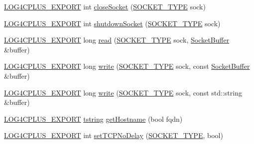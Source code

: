 \begin{DoxyCompactItemize}
\item 
\hyperlink{config_8hxx_ab13cb1a5317c245ee2ef4f2bfe0cfb2d}{L\-O\-G4\-C\-P\-L\-U\-S\-\_\-\-E\-X\-P\-O\-R\-T} int \hyperlink{namespacelog4cplus_1_1helpers_a3b3948988abc22a173de7815370a4527}{close\-Socket} (\hyperlink{namespacelog4cplus_1_1helpers_afe2a1567866b6a9e0bfd5d425c3323f2}{S\-O\-C\-K\-E\-T\-\_\-\-T\-Y\-P\-E} sock)
\item 
\hyperlink{config_8hxx_ab13cb1a5317c245ee2ef4f2bfe0cfb2d}{L\-O\-G4\-C\-P\-L\-U\-S\-\_\-\-E\-X\-P\-O\-R\-T} int \hyperlink{namespacelog4cplus_1_1helpers_af5c4aabb0dd714fbec7cc7bc31222f5b}{shutdown\-Socket} (\hyperlink{namespacelog4cplus_1_1helpers_afe2a1567866b6a9e0bfd5d425c3323f2}{S\-O\-C\-K\-E\-T\-\_\-\-T\-Y\-P\-E} sock)
\item 
\hyperlink{config_8hxx_ab13cb1a5317c245ee2ef4f2bfe0cfb2d}{L\-O\-G4\-C\-P\-L\-U\-S\-\_\-\-E\-X\-P\-O\-R\-T} long \hyperlink{namespacelog4cplus_1_1helpers_a34dfe75b9deb21d9c48a5c5a68baec87}{read} (\hyperlink{namespacelog4cplus_1_1helpers_afe2a1567866b6a9e0bfd5d425c3323f2}{S\-O\-C\-K\-E\-T\-\_\-\-T\-Y\-P\-E} sock, \hyperlink{classlog4cplus_1_1helpers_1_1SocketBuffer}{Socket\-Buffer} \&buffer)
\item 
\hyperlink{config_8hxx_ab13cb1a5317c245ee2ef4f2bfe0cfb2d}{L\-O\-G4\-C\-P\-L\-U\-S\-\_\-\-E\-X\-P\-O\-R\-T} long \hyperlink{namespacelog4cplus_1_1helpers_adf5c3e3ef3b2737e0dcf4dcb9cca2a41}{write} (\hyperlink{namespacelog4cplus_1_1helpers_afe2a1567866b6a9e0bfd5d425c3323f2}{S\-O\-C\-K\-E\-T\-\_\-\-T\-Y\-P\-E} sock, const \hyperlink{classlog4cplus_1_1helpers_1_1SocketBuffer}{Socket\-Buffer} \&buffer)
\item 
\hyperlink{config_8hxx_ab13cb1a5317c245ee2ef4f2bfe0cfb2d}{L\-O\-G4\-C\-P\-L\-U\-S\-\_\-\-E\-X\-P\-O\-R\-T} long \hyperlink{namespacelog4cplus_1_1helpers_acb89fc8734cd72457defd8c9e7c85f19}{write} (\hyperlink{namespacelog4cplus_1_1helpers_afe2a1567866b6a9e0bfd5d425c3323f2}{S\-O\-C\-K\-E\-T\-\_\-\-T\-Y\-P\-E} sock, const std\-::string \&buffer)
\item 
\hyperlink{config_8hxx_ab13cb1a5317c245ee2ef4f2bfe0cfb2d}{L\-O\-G4\-C\-P\-L\-U\-S\-\_\-\-E\-X\-P\-O\-R\-T} \hyperlink{namespacelog4cplus_a3c9287f6ebcddc50355e29d71152117b}{tstring} \hyperlink{namespacelog4cplus_1_1helpers_a8bbc22ccb8a533bae0a8820fd97cd319}{get\-Hostname} (bool fqdn)
\item 
\hyperlink{config_8hxx_ab13cb1a5317c245ee2ef4f2bfe0cfb2d}{L\-O\-G4\-C\-P\-L\-U\-S\-\_\-\-E\-X\-P\-O\-R\-T} int \hyperlink{namespacelog4cplus_1_1helpers_a7a91e8804b0b10d01c383256a7516a2d}{set\-T\-C\-P\-No\-Delay} (\hyperlink{namespacelog4cplus_1_1helpers_afe2a1567866b6a9e0bfd5d425c3323f2}{S\-O\-C\-K\-E\-T\-\_\-\-T\-Y\-P\-E}, bool)

\end{DoxyCompactItemize}
